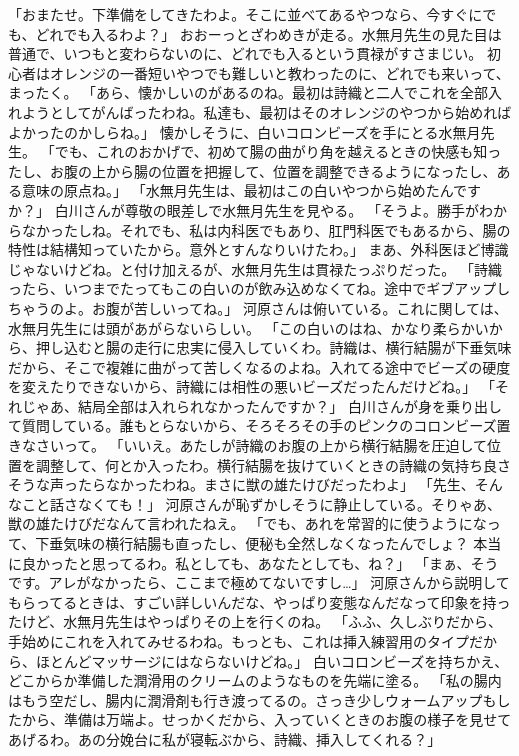 「おまたせ。下準備をしてきたわよ。そこに並べてあるやつなら、今すぐにでも、どれでも入るわよ？」
おおーっとざわめきが走る。水無月先生の見た目は普通で、いつもと変わらないのに、どれでも入るという貫禄がすさまじい。
初心者はオレンジの一番短いやつでも難しいと教わったのに、どれでも来いって、まったく。
「あら、懐かしいのがあるのね。最初は詩織と二人でこれを全部入れようとしてがんばったわね。私達も、最初はそのオレンジのやつから始めればよかったのかしらね。」
懐かしそうに、白いコロンビーズを手にとる水無月先生。
「でも、これのおかげで、初めて腸の曲がり角を越えるときの快感も知ったし、お腹の上から腸の位置を把握して、位置を調整できるようになったし、ある意味の原点ね。」
「水無月先生は、最初はこの白いやつから始めたんですか？」
白川さんが尊敬の眼差しで水無月先生を見やる。
「そうよ。勝手がわからなかったしね。それでも、私は内科医でもあり、肛門科医でもあるから、腸の特性は結構知っていたから。意外とすんなりいけたわ。」
まあ、外科医ほど博識じゃないけどね。と付け加えるが、水無月先生は貫禄たっぷりだった。
「詩織ったら、いつまでたってもこの白いのが飲み込めなくてね。途中でギブアップしちゃうのよ。お腹が苦しいってね。」
河原さんは俯いている。これに関しては、水無月先生には頭があがらないらしい。
「この白いのはね、かなり柔らかいから、押し込むと腸の走行に忠実に侵入していくわ。詩織は、横行結腸が下垂気味だから、そこで複雑に曲がって苦しくなるのよね。入れてる途中でビーズの硬度を変えたりできないから、詩織には相性の悪いビーズだったんだけどね。」
「それじゃあ、結局全部は入れられなかったんですか？」
白川さんが身を乗り出して質問している。誰もとらないから、そろそろその手のピンクのコロンビーズ置きなさいって。
「いいえ。あたしが詩織のお腹の上から横行結腸を圧迫して位置を調整して、何とか入ったわ。横行結腸を抜けていくときの詩織の気持ち良さそうな声ったらなかったわね。まさに獣の雄たけびだったわよ」
「先生、そんなこと話さなくても！」
河原さんが恥ずかしそうに静止している。そりゃあ、獣の雄たけびだなんて言われたねえ。
「でも、あれを常習的に使うようになって、下垂気味の横行結腸も直ったし、便秘も全然しなくなったんでしょ？ 本当に良かったと思ってるわ。私としても、あなたとしても、ね？」
「まぁ、そうです。アレがなかったら、ここまで極めてないですし…」
河原さんから説明してもらってるときは、すごい詳しいんだな、やっぱり変態なんだなって印象を持ったけど、水無月先生はやっぱりその上を行くのね。
「ふふ、久しぶりだから、手始めにこれを入れてみせるわね。もっとも、これは挿入練習用のタイプだから、ほとんどマッサージにはならないけどね。」
白いコロンビーズを持ちかえ、どこからか準備した潤滑用のクリームのようなものを先端に塗る。
「私の腸内はもう空だし、腸内に潤滑剤も行き渡ってるの。さっき少しウォームアップもしたから、準備は万端よ。せっかくだから、入っていくときのお腹の様子を見せてあげるわ。あの分娩台に私が寝転ぶから、詩織、挿入してくれる？」
